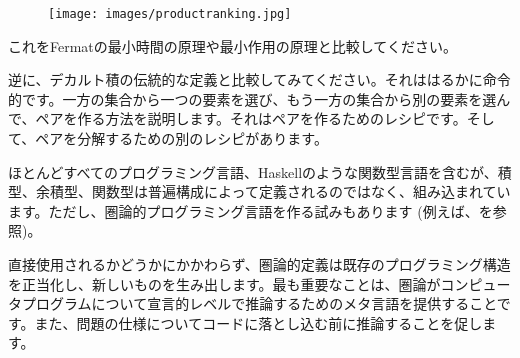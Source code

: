 \begin{figure}[H]
  \centering
  \texttt{[image: images/productranking.jpg]}
\end{figure}

\noindent
これをFermatの最小時間の原理や最小作用の原理と比較してください。

逆に、デカルト積の伝統的な定義と比較してみてください。それははるかに命令的です。一方の集合から一つの要素を選び、もう一方の集合から別の要素を選んで、ペアを作る方法を説明します。それはペアを作るためのレシピです。そして、ペアを分解するための別のレシピがあります。

ほとんどすべてのプログラミング言語、Haskellのような関数型言語を含むが、積型、余積型、関数型は普遍構成によって定義されるのではなく、組み込まれています。ただし、圏論的プログラミング言語を作る試みもあります (例えば、を参照)。

直接使用されるかどうかにかかわらず、圏論的定義は既存のプログラミング構造を正当化し、新しいものを生み出します。最も重要なことは、圏論がコンピュータプログラムについて宣言的レベルで推論するためのメタ言語を提供することです。また、問題の仕様についてコードに落とし込む前に推論することを促します。


